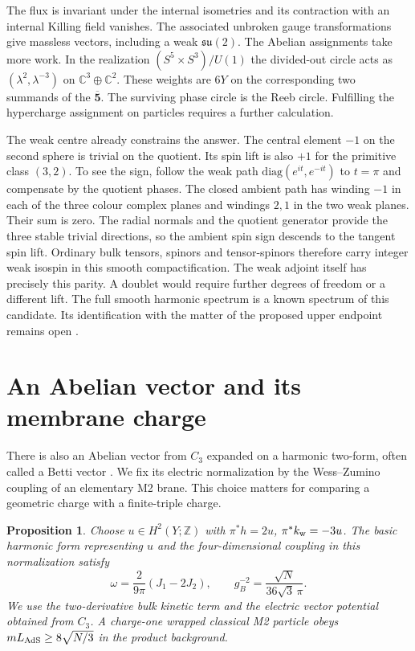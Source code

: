 \documentclass[aps,prd,reprint,onecolumn,nofootinbib,amsmath,amssymb]{revtex4-2}
\newtheorem{proposition}{Proposition}
\begin{document}
The flux is invariant under the internal isometries and its contraction with an internal Killing field vanishes. The associated unbroken gauge transformations give massless vectors, including a weak $\mathfrak{su}(2)$. The Abelian assignments take more work. In the realization $(S^5\times S^3)/U(1)$ the divided-out circle acts as $(\lambda^2,\lambda^{-3})$ on $\mathbb C^3\oplus\mathbb C^2$. These weights are $6Y$ on the corresponding two summands of the $\overline{\mathbf5}$. The surviving phase circle is the Reeb circle. Fulfilling the hypercharge assignment on particles requires a further calculation.

The weak centre already constrains the answer. The central element $-1$ on the second sphere is trivial on the quotient. Its spin lift is also $+1$ for the primitive class $(3,2)$. To see the sign, follow the weak path $\mathrm{diag}(e^{it},e^{-it})$ to $t=\pi$ and compensate by the quotient phases. The closed ambient path has winding $-1$ in each of the three colour complex planes and windings $2,1$ in the two weak planes. Their sum is zero. The radial normals and the quotient generator provide the three stable trivial directions, so the ambient spin sign descends to the tangent spin lift. Ordinary bulk tensors, spinors and tensor-spinors therefore carry integer weak isospin in this smooth compactification. The weak adjoint itself has precisely this parity. A doublet would require further degrees of freedom or a different lift. The full smooth harmonic spectrum is a known spectrum of this candidate. Its identification with the matter of the proposed upper endpoint remains open \cite{Fabbri1999}.

\section{An Abelian vector and its membrane charge}
There is also an Abelian vector from $C_3$ expanded on a harmonic two-form, often called a Betti vector \cite{KPTBetti}. We fix its electric normalization by the Wess--Zumino coupling of an elementary M2 brane. This choice matters for comparing a geometric charge with a finite-triple charge.

\begin{proposition}
Choose $u\in H^2(Y;\mathbb Z)$ with $\pi^*h=2u$, $\pi^*k_{\rm w}=-3u$. The basic harmonic form representing $u$ and the four-dimensional coupling in this normalization satisfy
\begin{equation}
 \omega=\frac{2}{9\pi}(J_1-2J_2),\qquad
 g_B^{-2}=\frac{\sqrt N}{36\sqrt3\,\pi}.
 \label{eq:betti}
\end{equation}
We use the two-derivative bulk kinetic term and the electric vector potential obtained from $C_3$. A charge-one wrapped classical M2 particle obeys $m L_{\rm AdS}\ge 8\sqrt{N/3}$ in the product background.
\end{proposition}
\end{document}
